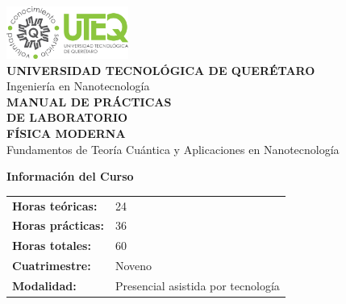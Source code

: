 \documentclass[12pt,a4paper]{book}
\begin{document}
	
	\begin{titlepage}
		\begin{center}
			
			\includegraphics[width=4cm]{../../Imagenes/Logo_uteq}\\[1cm]
			
			{\large \textcolor{uteqblue}{\textbf{UNIVERSIDAD TECNOLÓGICA DE QUERÉTARO}}}\\[0.3cm]
			{\normalsize \textcolor{uteqgray}{Ingeniería en Nanotecnología}}\\[2cm]
			
			{\Huge \textcolor{uteqblue}{\textbf{MANUAL DE PRÁCTICAS}}}\\[0.5cm]
			{\Huge \textcolor{uteqblue}{\textbf{DE LABORATORIO}}}\\[1cm]
			
			{\LARGE \textcolor{uteqgray}{\textbf{FÍSICA MODERNA}}}\\[0.3cm]
			{\large \textcolor{uteqgray}{Fundamentos de Teoría Cuántica y Aplicaciones en Nanotecnología}}\\[4cm]
			
			\begin{tcolorbox}[colback=uteqblue!10!white,colframe=uteqblue,width=12cm]
				\begin{center}
					\textbf{Información del Curso}\\[0.3cm]
					\begin{tabular}{ll}
						\textbf{Horas teóricas:} & 24 \\
						\textbf{Horas prácticas:} & 36 \\
						\textbf{Horas totales:} & 60 \\
						\textbf{Cuatrimestre:} & Noveno \\
						\textbf{Modalidad:} & Presencial asistida por tecnología \\
					\end{tabular}
				\end{center}
			\end{tcolorbox}
			
			\vfill
			

\end{center}
\end{titlepage}
\end{document}
